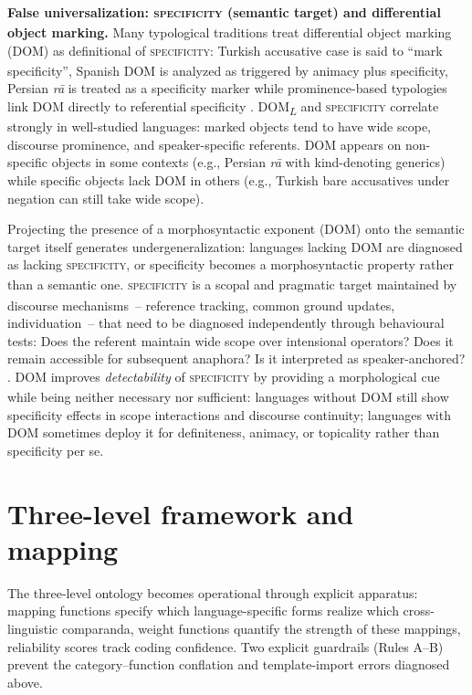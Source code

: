 \documentclass[12pt]{article}
\begin{document}
\begin{exe}
\ex\label{ex:specificity-dom}
\textbf{False universalization: \textsc{specificity}\textsubscript{\Cross} (semantic target) and differential object marking.}
Many typological traditions treat differential object marking (DOM) as definitional of \textsc{specificity}\textsubscript{\Cross}: Turkish accusative case is said to \enquote{mark specificity}, Spanish DOM is analyzed as triggered by animacy plus specificity, Persian \textit{r\=a} is treated as a specificity marker \parencite{HeusingerBamyaci2017,Leonetti2004,Karimi1996} while prominence-based typologies link DOM directly to referential specificity \parencite{Aissen2003}. DOM\textsubscript{$L$} and \textsc{specificity}\textsubscript{\Cross} correlate strongly in well-studied languages: marked objects tend to have wide scope, discourse prominence, and speaker-specific referents. DOM appears on non-specific objects in some contexts (e.g., Persian \textit{r\=a} with kind-denoting generics) while specific objects lack DOM in others (e.g., Turkish bare accusatives under negation can still take wide scope).

Projecting the presence of a morphosyntactic exponent (DOM) onto the semantic target itself generates undergeneralization: languages lacking DOM are diagnosed as lacking \textsc{specificity}\textsubscript{\Cross}, or specificity becomes a morphosyntactic property rather than a semantic one. \textsc{specificity}\textsubscript{\Cross} is a scopal and pragmatic target maintained by discourse mechanisms~-- reference tracking, common ground updates, individuation~-- that need to  be diagnosed independently through behavioural tests: Does the referent maintain wide scope over intensional operators? Does it remain accessible for subsequent anaphora? Is it interpreted as speaker-anchored? \parencite{Enc1991,Heusinger2011}. DOM improves \textit{detectability} of \textsc{specificity}\textsubscript{\Cross} by providing a morphological cue while being neither necessary nor sufficient: languages without DOM still show specificity effects in scope interactions and discourse continuity; languages with DOM sometimes deploy it for definiteness, animacy, or topicality rather than specificity per se.

\end{exe}

\section{Three-level framework and mapping}\label{sec:matrix}
The three-level ontology becomes operational through explicit apparatus: mapping functions specify which language-specific forms realize which cross-linguistic comparanda, weight functions quantify the strength of these mappings, reliability scores track coding confidence. Two explicit guardrails (Rules A--B) prevent the category--function conflation and template-import errors diagnosed above.
\end{document}
